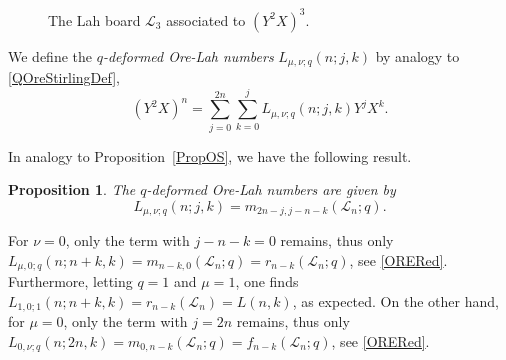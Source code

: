 \documentclass[10pt]{amsart}
\newtheorem{proposition}[theorem]{Proposition}%
\begin{document}
\begin{figure}[h]
\centering
{}
\caption{The Lah board ${\mathcal L}_3$ associated to $(Y^2X)^3$.}\label{Laguerre}
\end{figure}
We define the {\em $q$-deformed Ore-Lah numbers} $L_{\mu,\nu;q}(n;j,k)$ by analogy to \eqref{QOreStirlingDef},
\begin{equation}\label{QOreLahDef}
(Y^2X)^n = \sum_{j=0}^{2n} \sum_{k=0}^{j} L_{\mu,\nu;q}(n;j,k) Y^{j}X^{k}.
\end{equation}

In analogy to Proposition~\ref{PropOS}, we have the following result.
\begin{proposition} The $q$-deformed Ore-Lah numbers are given by
\begin{equation}\label{QORELAHEX}
L_{\mu,\nu;q}(n;j,k)=m_{2n-j,j-n-k}({\mathcal L}_n;q). 
\end{equation}
\end{proposition}
For $\nu =0$, only the term with $j-n-k=0$ remains, thus only $L_{\mu,0;q}(n;n+k,k)=m_{n-k,0}({\mathcal L}_n;q)=r_{n-k}({\mathcal L}_n;q)$, see \eqref{ORERed}. Furthermore, letting $q=1$ and $\mu=1$, one finds $L_{1,0;1}(n;n+k,k)=r_{n-k}({\mathcal L}_n)=L(n,k)$, as expected. On the other hand, for $\mu=0$, only the term with $j=2n$ remains, thus only $L_{0,\nu;q}(n;2n,k)=m_{0,n-k}({\mathcal L}_n;q)=f_{n-k}({\mathcal L}_n;q)$, see \eqref{ORERed}.
\end{document}
